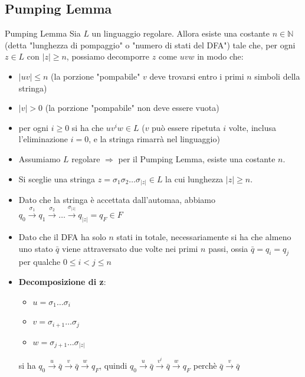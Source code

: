 \documentclass[12pt, a4paper]{report}
\begin{document}
            \subsection{Pumping Lemma}
                \begin{theorembox}{Pumping Lemma}{}
                    Sia $L$ un linguaggio regolare. Allora esiste una costante $n\in\mathbb{N}$ (detta "lunghezza di pompaggio" o "numero di stati del DFA") tale che, per ogni $z\in L$ con $|z|\geq n$, possiamo decomporre $z$ come $uvw$ in modo che: \begin{itemize}
                        \item $|uv|\leq n$ (la porzione "pompabile" $v$ deve trovarsi entro i primi $n$ simboli della stringa)
                        \item $|v|>0$ (la porzione "pompabile" non deve essere vuota)
                        \item per ogni $i\geq 0$ si ha che $uv^iw\in L$ ($v$ può essere ripetuta $i$ volte, inclusa l'eliminazione $i=0$, e la stringa rimarrà nel linguaggio)
                    \end{itemize}
                \end{theorembox}
                \begin{demonstration}
                    \begin{itemize}
                        \item Assumiamo $L$ regolare $\Rightarrow$ per il Pumping Lemma, esiste una costante $n$.
                        \item Si sceglie una stringa $z=\sigma_1\sigma_2\ldots\sigma_{|z|}\in L$ la cui lunghezza $|z|\geq n$.
                        \item Dato che la stringa è accettata dall'automaa, abbiamo $q_0\xrightarrow{\sigma_1}q_1\xrightarrow{\sigma_2}\ldots\xrightarrow{\sigma_{|z|}}q_{|z|}=q_F\in F$
                        \item Dato che il DFA ha solo $n$ stati in totale, necessariamente si ha che almeno uno stato $\bar{q}$ viene attraversato due volte nei primi $n$ passi, ossia $\bar{q}=q_i=q_j$ per qualche $0\leq i<j\leq n$
                        \item \textbf{Decomposizione di z}: \begin{itemize}
                            \item $u=\sigma_1\ldots\sigma_i$
                            \item $v=\sigma_{i+1}\ldots\sigma_j$
                            \item $w=\sigma_{j+1}\ldots\sigma_{|z|}$
                        \end{itemize}
                        si ha $q_0\xrightarrow{u}\bar{q}\xrightarrow{v}\bar{q}\xrightarrow{w}q_F$, quindi $q_0\xrightarrow{u}\bar{q}\xrightarrow{v^i}\bar{q}\xrightarrow{w}q_F$ perchè $\bar{q}\xrightarrow{v}\bar{q}$
                    \end{itemize}
                \end{demonstration}
\end{document}
